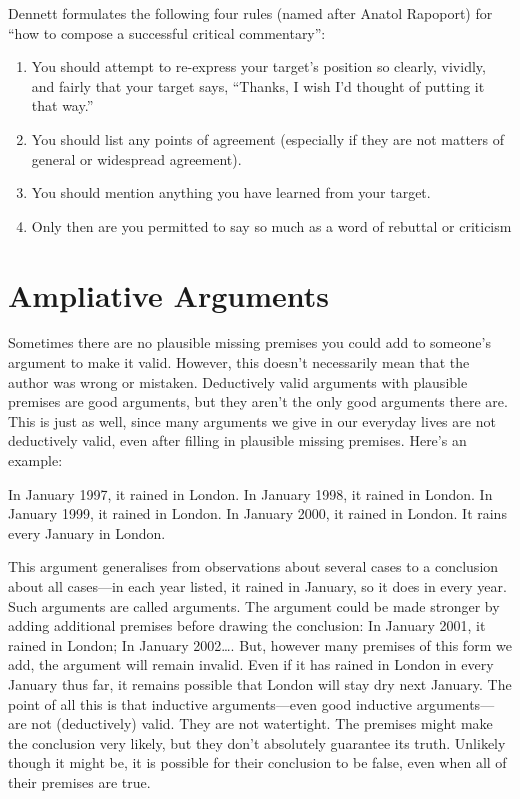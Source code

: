 Dennett formulates the following four rules (named after
Anatol Rapoport) for “how to compose a successful critical
commentary”:
\begin{enumerate}
\item You should attempt to re-express your target’s position so
clearly, vividly, and fairly that your target says, “Thanks, I
wish I’d thought of putting it that way.”
\item You should list any points of agreement (especially if they
are not matters of general or widespread agreement).
\item You should mention anything you have learned from your
target.
\item Only then are you permitted to say so much as a word of
rebuttal or criticism
\end{enumerate}



\section{Ampliative Arguments}
Sometimes there are no plausible missing premises you could add to someone's argument to make it valid. 
However, this doesn't necessarily mean that the author was wrong or mistaken. 
Deductively valid arguments with plausible premises are good arguments, but they aren't the only good arguments there are. This is just as well, since many arguments we give in our everyday lives are not deductively valid, even after filling in plausible missing premises. Here's an example:
	\begin{earg}
		\prem In January 1997, it rained in London.
		\prem In January 1998, it rained in London.
		\prem In January 1999, it rained in London.
		\prem In January 2000, it rained in London.
	\conc It rains every January in London.
\end{earg}

This argument generalises from observations about several cases to a conclusion about all cases---in each year listed, it rained in January, so it does in every year. Such arguments are called  arguments. The argument could be made stronger by adding additional premises before drawing the conclusion: In January 2001, it rained in London; In January 2002\ldots. But, however many premises of this form we add, the argument will remain invalid. Even if it has rained in London in every January thus far, it remains possible that London will stay dry next January. The point of all this is that inductive arguments—even good inductive arguments—are not (deductively) valid. They are not watertight. The premises might make the conclusion very likely, but they don't absolutely guarantee its truth. Unlikely though it might be, it is possible for their conclusion to be false, even when all of their premises are true.

